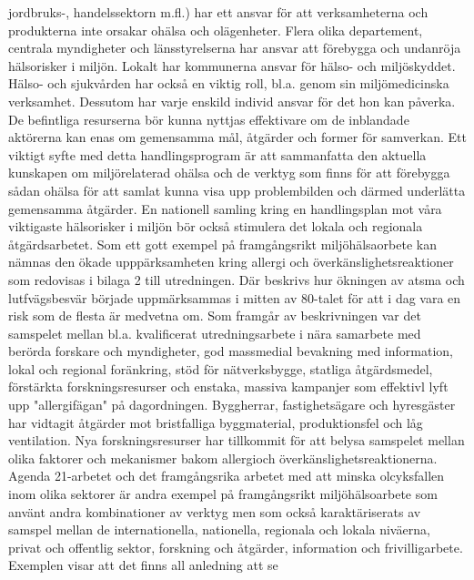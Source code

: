 jordbruks-, handelssektorn m.fl.) har ett ansvar för att verksamheterna och produkterna inte orsakar ohälsa och olägenheter. Flera olika departement, centrala myndigheter och länsstyrelserna har ansvar att förebygga och undanröja hälsorisker i miljön. Lokalt har kommunerna ansvar för hälso- och miljöskyddet. Hälso- och sjukvården har också en viktig roll, bl.a. genom sin miljömedicinska verksamhet. Dessutom har varje enskild individ ansvar för det hon kan påverka.
De befintliga resurserna bör kunna nyttjas effektivare om de inblandade aktörerna kan enas om gemensamma mål, åtgärder och former för samverkan. Ett viktigt syfte med detta handlingsprogram är att sammanfatta den aktuella kunskapen om miljörelaterad ohälsa och de verktyg som finns för att förebygga sådan ohälsa för att samlat kunna visa upp problembilden och därmed underlätta gemensamma åtgärder. En nationell samling kring en handlingsplan mot våra viktigaste hälsorisker i miljön bör också stimulera det lokala och regionala åtgärdsarbetet.
Som ett gott exempel på framgångsrikt miljöhälsaorbete kan nämnas den ökade upppärksamheten kring allergi och överkänslighetsreaktioner som redovisas i bilaga 2 till utredningen. Där beskrivs hur ökningen av atsma och lutfvägsbesvär började uppmärksammas i mitten av 80-talet för att i dag vara en risk som de flesta är medvetna om. Som framgår av beskrivningen var det samspelet mellan bl.a. kvalificerat utredningsarbete i nära samarbete med berörda forskare och myndigheter, god massmedial bevakning med information, lokal och regional foränkring, stöd för nätverksbygge, statliga åtgärdsmedel, förstärkta forskningsresurser och enstaka, massiva kampanjer som effektivl lyft upp "allergifägan" på dagordningen. Byggherrar, fastighetsägare och hyresgäster har vidtagit åtgärder mot bristfalliga byggmaterial, produktionsfel och låg ventilation. Nya forskningsresurser har tillkommit för att belysa samspelet mellan olika faktorer och mekanismer bakom allergioch överkänslighetsreaktionerna.
Agenda 21-arbetet och det framgångsrika arbetet med att minska olcyksfallen inom olika sektorer är andra exempel på framgångsrikt miljöhälsoarbete som använt andra kombinationer av verktyg men som också karaktäriserats av samspel mellan de internationella, nationella, regionala och lokala niväerna, privat och offentlig sektor, forskning och åtgärder, information och frivilligarbete. Exemplen visar att det finns all anledning att se

